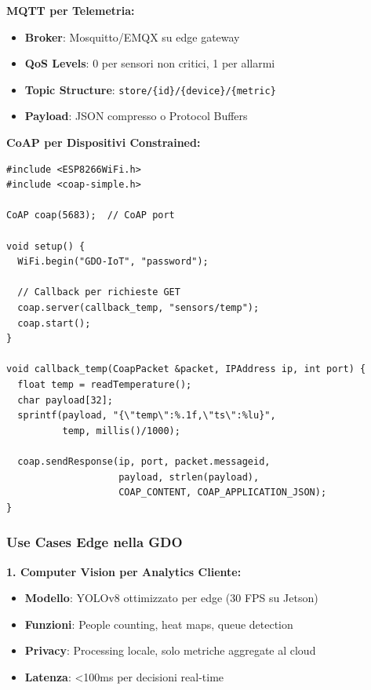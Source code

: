 \textbf{MQTT per Telemetria:}
\begin{itemize}
    \item \textbf{Broker}: Mosquitto/EMQX su edge gateway
    \item \textbf{QoS Levels}: 0 per sensori non critici, 1 per allarmi
    \item \textbf{Topic Structure}: \texttt{store/\{id\}/\{device\}/\{metric\}}
    \item \textbf{Payload}: JSON compresso o Protocol Buffers
\end{itemize}

\textbf{CoAP per Dispositivi Constrained:}
\begin{lstlisting}[caption={CoAP Client per Sensore Temperatura},label={lst:coap_sensor}]
#include <ESP8266WiFi.h>
#include <coap-simple.h>

CoAP coap(5683);  // CoAP port

void setup() {
  WiFi.begin("GDO-IoT", "password");
  
  // Callback per richieste GET
  coap.server(callback_temp, "sensors/temp");
  coap.start();
}

void callback_temp(CoapPacket &packet, IPAddress ip, int port) {
  float temp = readTemperature();
  char payload[32];
  sprintf(payload, "{\"temp\":%.1f,\"ts\":%lu}", 
          temp, millis()/1000);
  
  coap.sendResponse(ip, port, packet.messageid, 
                    payload, strlen(payload),
                    COAP_CONTENT, COAP_APPLICATION_JSON);
}
\end{lstlisting}

\subsubsection{\texorpdfstring{\textbf{Use Cases Edge nella GDO}}{3.3.2.4 - Use Cases Edge nella GDO}}

\textbf{1. Computer Vision per Analytics Cliente:}
\begin{itemize}
    \item \textbf{Modello}: YOLOv8 ottimizzato per edge (30 FPS su Jetson)
    \item \textbf{Funzioni}: People counting, heat maps, queue detection
    \item \textbf{Privacy}: Processing locale, solo metriche aggregate al cloud
    \item \textbf{Latenza}: <100ms per decisioni real-time
\end{itemize}

